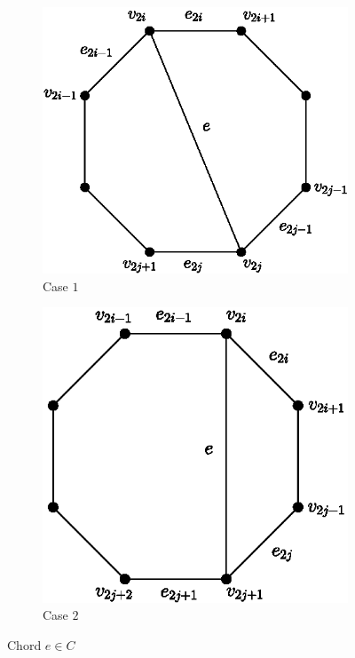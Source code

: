\documentclass[11pt]{article}
\numberwithin{theorem}{section}
\begin{document}
 \begin{figure}
\centering
\begin{subfigure}{.4\textwidth}
  \centering
  \includegraphics[width=.85\linewidth]{KernelMengerianO-fig1a}
  \caption{Case $1$}
  \label{fig1a}
\end{subfigure}%
\begin{subfigure}{.4\textwidth}
  \centering
  \includegraphics[width=.845\linewidth]{KernelMengerianO-fig1b}
  \caption{Case $2$}
  \label{fig1b}
\end{subfigure}
\caption{Chord $e \in C$}
\end{figure}
\end{document}

